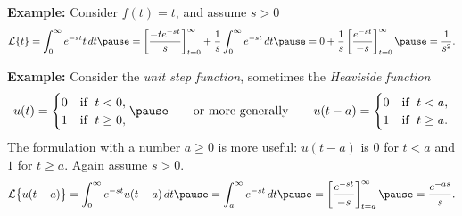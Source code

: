 \documentclass[10pt,aspectratio=169]{beamer}
\begin{document}
\begin{frame}
\textbf{Example:}
Consider $f(t) = t$, and assume $s > 0$
\begin{equation*}
\mathcal{L} \{t\}
= \int_0^\infty e^{-st} t \, dt
\pause
=
\left[ \frac{-te^{-st}}{s} \right]_{t=0}^\infty
+
\frac{1}{s}
\int_0^\infty e^{-st} \,dt
\pause
=
0
+
\frac{1}{s}
\left[ \frac{e^{-st}}{-s} \right]_{t=0}^\infty
\pause
=
\frac{1}{s^2} .
\end{equation*}

\medskip
\pause

\textbf{Example:}  Consider the
\emph{unit step function}, sometimes the
\emph{Heaviside function}
\begin{equation*}
u(t) = 
\begin{cases}
0 & \text{if } \; t < 0 , \\
1 & \text{if } \; t \geq 0 ,
\end{cases}
\pause
\qquad
\text{or more generally}
\qquad
u(t-a) = 
\begin{cases}
0 & \text{if } \; t < a , \\
1 & \text{if } \; t \geq a .
\end{cases}
\end{equation*}
\pause
The formulation with a number $a \geq 0$ is more useful:
$u(t-a)$ is $0$ for $t < a$ and $1$ for $t \geq a$.
\pause
Again assume $s > 0$.
\pause
\[
\mathcal{L} \bigl\{ u(t-a) \bigr\}
=
\int_0^{\infty} e^{-st} u(t-a) \, dt
\pause
=
\int_a^{\infty} e^{-st} \, dt
\pause
=
\left[ \frac{e^{-st}}{-s} \right]_{t=a}^\infty
\pause
=
\frac{e^{-as}}{s} .
\]

\end{frame}
\end{document}
